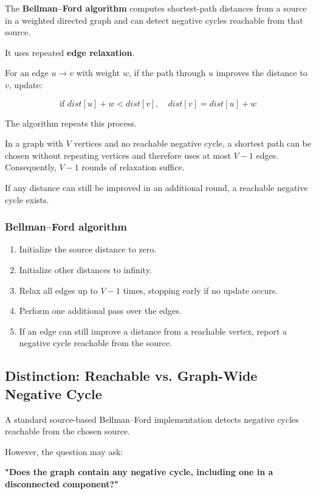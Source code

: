 The \textbf{Bellman--Ford algorithm} computes shortest-path distances from a source in a weighted directed graph and can detect negative cycles reachable from that source.

It uses repeated \textbf{edge relaxation}.

For an edge $u\rightarrow v$ with weight $w$, if the path through $u$ improves the distance to $v$, update:


\[
\boxed{ \text{if }dist[u]+w<dist[v], \quad dist[v]=dist[u]+w }
\]


The algorithm repeats this process.

In a graph with $V$ vertices and no reachable negative cycle, a shortest path can be chosen without repeating vertices and therefore uses at most $V-1$ edges. Consequently, $V-1$ rounds of relaxation suffice.

If any distance can still be improved in an additional round, a reachable negative cycle exists.

\subsubsection{Bellman--Ford algorithm}

\begin{enumerate}
    \item Initialize the source distance to zero.
    \item Initialize other distances to infinity.
    \item Relax all edges up to $V-1$ times, stopping early if no update occurs.
    \item Perform one additional pass over the edges.
    \item If an edge can still improve a distance from a reachable vertex, report a negative cycle reachable from the source.
\end{enumerate}

\subsection{Distinction: Reachable vs. Graph-Wide Negative Cycle}

A standard source-based Bellman--Ford implementation detects negative cycles reachable from the chosen source.

However, the question may ask:

\textbf{"Does the graph contain any negative cycle, including one in a disconnected component?"}

